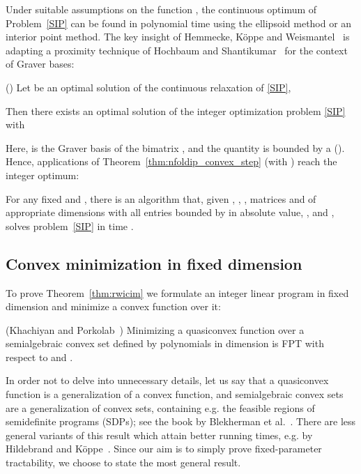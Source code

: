 \documentclass{llncs}
\newcommand{\FPT}{{\sf FPT}\xspace}
\begin{document}
 
Under suitable assumptions on the function , the continuous optimum  of Problem~\ref{SIP} can be found in polynomial time using the ellipsoid method or an interior point method. The key insight of Hemmecke, Köppe and Weismantel~\cite{HemmeckeKW14} is adapting a proximity technique of Hochbaum and Shantikumar~\cite{HochbaumS:90} for the context of Graver bases:

\begin{theorem}{(\cite[Theorem 3.14]{HemmeckeKW14})}
Let  be an optimal solution of the continuous relaxation
of \eqref{SIP},



Then there exists an optimal solution  of the integer optimization problem \eqref{SIP} with

 
\end{theorem}

Here,  is the Graver basis of the bimatrix , and the quantity  is bounded by a  (\cite[Lemma 3.20]{Onn:10}). Hence,  applications of Theorem~\ref{thm:nfoldip_convex_step} (with ) reach the integer optimum:

\begin{theorem}\label{thm:nfoldip_convex}
For any fixed  and , there is an algorithm that,
given , , , matrices  and  of appropriate dimensions with all entries
bounded by  in absolute value, , and , solves problem~\eqref{SIP} in
time .
\end{theorem}


\subsection{Convex minimization in fixed dimension}

To prove Theorem~\ref{thm:rwicim} we formulate an integer linear program in fixed dimension and minimize a convex function over it:

\begin{theorem}{(Khachiyan and Porkolab~\cite{KhachiyanP:00})}\label{thm:semialgebraic_ip_fpt}
  Minimizing a quasiconvex function over a semialgebraic convex set
  defined by  polynomials in dimension  is \FPT with respect to
   and .
\end{theorem}

In order not to delve into unnecessary details, let us say that a quasiconvex function is a generalization of a convex function, and semialgebraic convex sets are a generalization of convex sets, containing e.g. the feasible regions of semidefinite programs (SDPs); see the book by Blekherman et al.~\cite{BlekhermanPT:12}. There are less general variants of this result which attain better running times, e.g. by Hildebrand and Köppe~\cite{HildebrandK13}. Since our aim is to simply prove fixed-parameter tractability, we choose to state the most general result.
\end{document}

